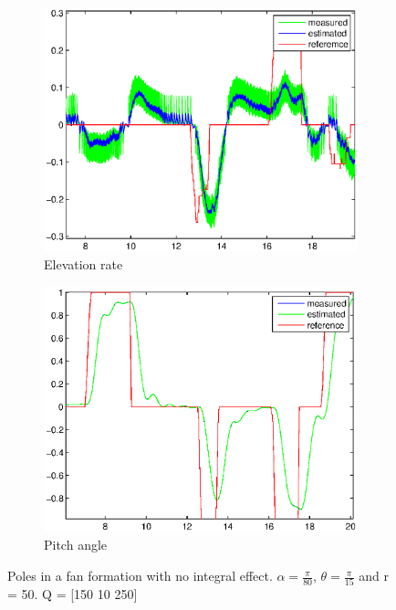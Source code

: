 \begin{figure}[H]
\graphicspath{ {Part4_pictures/}}
\begin{subfigure}{0.5\textwidth}
    \includegraphics[width=0.9\linewidth]{Part4_pictures/p4p2_noint/riktig_Q/elevationRate_PDreg_P2.eps} 
    \caption{Elevation rate}
    \label{fig:p4p2nointP1e}
\end{subfigure}
\begin{subfigure}{0.5\textwidth}
    \includegraphics[width=0.9\linewidth]{Part4_pictures/p4p2_noint/riktig_Q/pitch_PDreg_P2.eps}
    \caption{Pitch angle}
    \label{fig:p4p2nointP1p}
\end{subfigure}
\caption{Poles in a fan formation with no integral effect. $\alpha = \frac{\pi}{80}$, $\theta = \frac{\pi}{15}$ and r = 50. Q = [150 10 250]}
\label{p4p2nointP1}
\end{figure}
